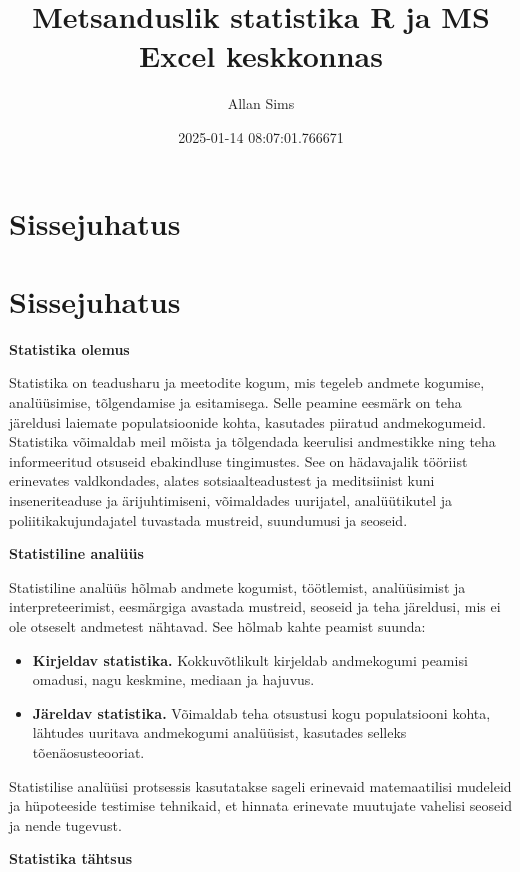 \documentclass[
]{book}
\title{Metsanduslik statistika R ja MS Excel keskkonnas}
\author{Allan Sims}
\date{2025-01-14 08:07:01.766671}
\providecommand{\tightlist}{%
  \setlength{\itemsep}{0pt}\setlength{\parskip}{0pt}}
\begin{document}
\maketitle

{
\setcounter{tocdepth}{1}
\tableofcontents
}
\chapter{Sissejuhatus}\label{sissejuhatus}

\chapter{Sissejuhatus}\label{sissejuhatus-1}

\textbf{Statistika olemus}

Statistika on teadusharu ja meetodite kogum, mis tegeleb andmete kogumise, analüüsimise, tõlgendamise ja esitamisega. Selle peamine eesmärk on teha järeldusi laiemate populatsioonide kohta, kasutades piiratud andmekogumeid. Statistika võimaldab meil mõista ja tõlgendada keerulisi andmestikke ning teha informeeritud otsuseid ebakindluse tingimustes. See on hädavajalik tööriist erinevates valdkondades, alates sotsiaalteadustest ja meditsiinist kuni inseneriteaduse ja ärijuhtimiseni, võimaldades uurijatel, analüütikutel ja poliitikakujundajatel tuvastada mustreid, suundumusi ja seoseid.

\textbf{Statistiline analüüs}

Statistiline analüüs hõlmab andmete kogumist, töötlemist, analüüsimist ja interpreteerimist, eesmärgiga avastada mustreid, seoseid ja teha järeldusi, mis ei ole otseselt andmetest nähtavad. See hõlmab kahte peamist suunda:

\begin{itemize}
\tightlist
\item
  \textbf{Kirjeldav statistika.} Kokkuvõtlikult kirjeldab andmekogumi peamisi omadusi, nagu keskmine, mediaan ja hajuvus.
\item
  \textbf{Järeldav statistika.} Võimaldab teha otsustusi kogu populatsiooni kohta, lähtudes uuritava andmekogumi analüüsist, kasutades selleks tõenäosusteooriat.
\end{itemize}

Statistilise analüüsi protsessis kasutatakse sageli erinevaid matemaatilisi mudeleid ja hüpoteeside testimise tehnikaid, et hinnata erinevate muutujate vahelisi seoseid ja nende tugevust.

\textbf{Statistika tähtsus}
\end{document}
